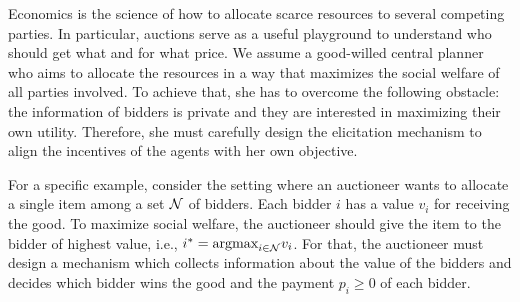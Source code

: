 Economics is the science of how to allocate scarce resources to several competing parties. In particular, auctions serve as a useful playground to understand who should get what and for what price.  
We assume a {good-willed} central planner who aims to allocate the resources in a way that maximizes the social welfare of all parties involved.  To achieve that, she has to overcome the following obstacle: the information of bidders is private and they are 
 interested in maximizing their own utility. Therefore, she must carefully design the elicitation mechanism to align the incentives of the agents with her own objective.
 




For a specific example, consider the  setting where an auctioneer 
wants to allocate a single item among a set $\mathcal{N}$ of  bidders.  
Each bidder $i$ has a value $v_i$ for receiving the good.  To maximize social welfare, the auctioneer should give the item to the bidder of highest value, i.e., $i^* = \text{argmax}_{i \in \mathcal{N}}{v_{i}}$.  %
For that, the auctioneer must design a mechanism which collects
information about the value of the bidders
and decides which bidder wins
the good and the payment $p_i \geq 0$ of each bidder.

